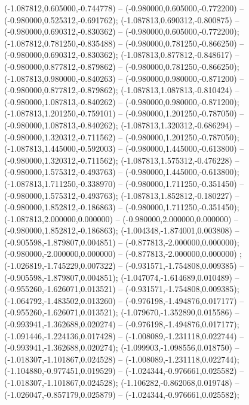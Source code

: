  (-1.087812,0.605000,-0.744778) -- (-0.980000,0.605000,-0.772200) -- (-0.980000,0.525312,-0.691762);
 (-1.087813,0.690312,-0.800875) -- (-0.980000,0.690312,-0.830362) -- (-0.980000,0.605000,-0.772200);
 (-1.087812,0.781250,-0.835488) -- (-0.980000,0.781250,-0.866250) -- (-0.980000,0.690312,-0.830362);
 (-1.087813,0.877812,-0.848617) -- (-0.980000,0.877812,-0.879862) -- (-0.980000,0.781250,-0.866250);
 (-1.087813,0.980000,-0.840263) -- (-0.980000,0.980000,-0.871200) -- (-0.980000,0.877812,-0.879862);
 (-1.087813,1.087813,-0.810424) -- (-0.980000,1.087813,-0.840262) -- (-0.980000,0.980000,-0.871200);
 (-1.087813,1.201250,-0.759101) -- (-0.980000,1.201250,-0.787050) -- (-0.980000,1.087813,-0.840262);
 (-1.087813,1.320312,-0.686294) -- (-0.980000,1.320312,-0.711562) -- (-0.980000,1.201250,-0.787050);
 (-1.087813,1.445000,-0.592003) -- (-0.980000,1.445000,-0.613800) -- (-0.980000,1.320312,-0.711562);
 (-1.087813,1.575312,-0.476228) -- (-0.980000,1.575312,-0.493763) -- (-0.980000,1.445000,-0.613800);
 (-1.087813,1.711250,-0.338970) -- (-0.980000,1.711250,-0.351450) -- (-0.980000,1.575312,-0.493763);
 (-1.087813,1.852812,-0.180227) -- (-0.980000,1.852812,-0.186863) -- (-0.980000,1.711250,-0.351450);
 (-1.087813,2.000000,0.000000) -- (-0.980000,2.000000,0.000000) -- (-0.980000,1.852812,-0.186863);
 (-1.004348,-1.874001,0.003808) -- (-0.905598,-1.879807,0.004851) -- (-0.877813,-2.000000,0.000000);
 (-0.980000,-2.000000,0.000000) -- (-0.877813,-2.000000,0.000000) ;
 (-1.026819,-1.745229,0.007322) -- (-0.931571,-1.754808,0.009385) -- (-0.905598,-1.879807,0.004851);
 (-1.047074,-1.614689,0.010489) -- (-0.955260,-1.626071,0.013521) -- (-0.931571,-1.754808,0.009385);
 (-1.064792,-1.483502,0.013260) -- (-0.976198,-1.494876,0.017177) -- (-0.955260,-1.626071,0.013521);
 (-1.079670,-1.352890,0.015586) -- (-0.993941,-1.362688,0.020274) -- (-0.976198,-1.494876,0.017177);
 (-1.091446,-1.224136,0.017428) -- (-1.008089,-1.231118,0.022744) -- (-0.993941,-1.362688,0.020274);
 (-1.099903,-1.098556,0.018750) -- (-1.018307,-1.101867,0.024528) -- (-1.008089,-1.231118,0.022744);
 (-1.104880,-0.977451,0.019529) -- (-1.024344,-0.976661,0.025582) -- (-1.018307,-1.101867,0.024528);
 (-1.106282,-0.862068,0.019748) -- (-1.026047,-0.857179,0.025879) -- (-1.024344,-0.976661,0.025582);
